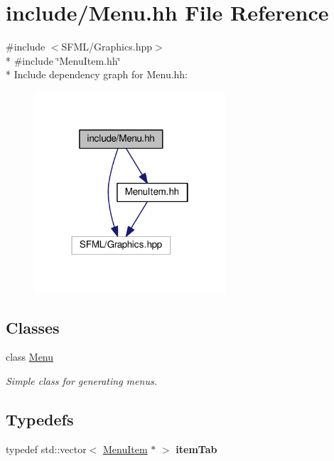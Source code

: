 \hypertarget{Menu_8hh}{}\section{include/\+Menu.hh File Reference}
\label{Menu_8hh}
{\ttfamily \#include $<$S\+F\+M\+L/\+Graphics.\+hpp$>$}\\*
{\ttfamily \#include \char`\"{}Menu\+Item.\+hh\char`\"{}}\\*
Include dependency graph for Menu.\+hh\+:
\nopagebreak
\begin{figure}[H]
\begin{center}
\leavevmode
\includegraphics[width=202pt]{Menu_8hh__incl}
\end{center}
\end{figure}
\subsection*{Classes}
\begin{DoxyCompactItemize}
\item 
class \hyperlink{classMenu}{Menu}
\begin{DoxyCompactList}\small\item\em Simple class for generating menus. \end{DoxyCompactList}\end{DoxyCompactItemize}
\subsection*{Typedefs}
\begin{DoxyCompactItemize}
\item 
typedef std\+::vector$<$ \hyperlink{classMenuItem}{Menu\+Item} $\ast$ $>$ {\bfseries item\+Tab}\hypertarget{Menu_8hh_a9ad12c681980730aa31035398264e44b}{}\label{Menu_8hh_a9ad12c681980730aa31035398264e44b}

\end{DoxyCompactItemize}
